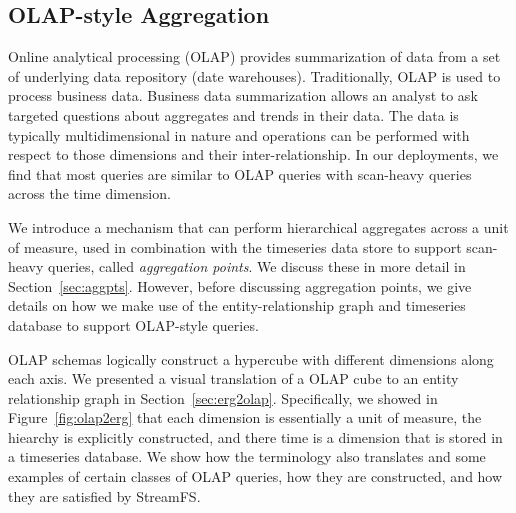 

\subsection{OLAP-style Aggregation}

Online analytical processing (OLAP) provides summarization of data
from a set of underlying data repository (date warehouses).  Traditionally, OLAP is used to process
business data.  Business data summarization allows an analyst to ask targeted questions about aggregates 
and trends in their data.  The data is typically multidimensional in nature and operations can be performed with
respect to those dimensions and their inter-relationship.  In our deployments, we find that most queries are 
similar to OLAP queries with scan-heavy queries across the time dimension.

We introduce a mechanism that can perform hierarchical aggregates across a unit of measure, used in combination
with the timeseries data store to support scan-heavy queries, called \emph{aggregation points}.  We discuss
these in more detail in Section~\ref{sec:aggpts}.  However, before discussing aggregation points, we give details
on how we make use of the entity-relationship graph and timeseries database to support OLAP-style queries.

OLAP schemas logically construct a hypercube with different dimensions along each axis.  We presented a visual translation of
a OLAP cube to an entity relationship graph in Section~\ref{sec:erg2olap}.  Specifically, we showed in Figure~\ref{fig:olap2erg}
that each dimension is essentially a unit of measure, the hiearchy is explicitly constructed, and there
time is a dimension that is stored in a timeseries database.  We show how the terminology also translates and some
examples of certain classes of OLAP queries, how they are constructed, and how they are satisfied by StreamFS.

